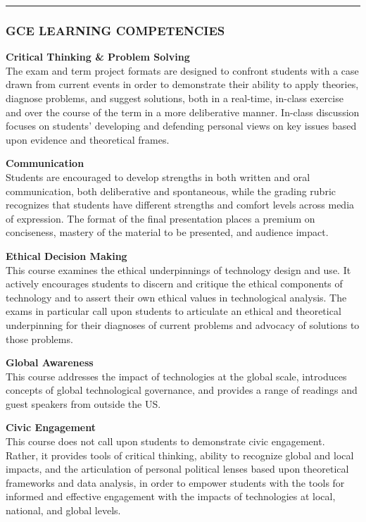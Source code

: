 \documentclass[]{tufte-handout}
\begin{document}
\begin{center}\rule{0.5\linewidth}{0.5pt}\end{center}

\hypertarget{gce-learning-competencies}{%
\subsubsection{GCE LEARNING
COMPETENCIES}\label{gce-learning-competencies}}

\textbf{Critical Thinking \& Problem Solving}\\
The exam and term project formats are designed to confront students with
a case drawn from current events in order to demonstrate their ability
to apply theories, diagnose problems, and suggest solutions, both in a
real-time, in-class exercise and over the course of the term in a more
deliberative manner. In-class discussion focuses on students' developing
and defending personal views on key issues based upon evidence and
theoretical frames.

\textbf{Communication}\\
Students are encouraged to develop strengths in both written and oral
communication, both deliberative and spontaneous, while the grading
rubric recognizes that students have different strengths and comfort
levels across media of expression. The format of the final presentation
places a premium on conciseness, mastery of the material to be
presented, and audience impact.

\textbf{Ethical Decision Making}\\
This course examines the ethical underpinnings of technology design and
use. It actively encourages students to discern and critique the ethical
components of technology and to assert their own ethical values in
technological analysis. The exams in particular call upon students to
articulate an ethical and theoretical underpinning for their diagnoses
of current problems and advocacy of solutions to those problems.

\textbf{Global Awareness}\\
This course addresses the impact of technologies at the global scale,
introduces concepts of global technological governance, and provides a
range of readings and guest speakers from outside the US.

\textbf{Civic Engagement}\\
This course does not call upon students to demonstrate civic engagement.
Rather, it provides tools of critical thinking, ability to recognize
global and local impacts, and the articulation of personal political
lenses based upon theoretical frameworks and data analysis, in order to
empower students with the tools for informed and effective engagement
with the impacts of technologies at local, national, and global levels.
\end{document}
